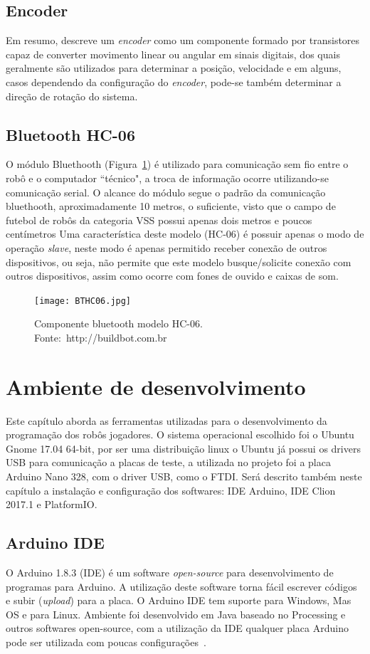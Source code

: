 \documentclass[a4paper,12pt,portuguese]{ufms-cpcx}
\begin{document}
\section{Encoder}\label{encoder}
Em resumo,  descreve um \textit{encoder} como um componente formado por transistores capaz de converter movimento linear ou angular em sinais digitais, dos quais geralmente são utilizados para determinar a posição, velocidade e em alguns, casos dependendo da configuração do \textit{encoder}, pode-se também determinar a direção de rotação do sistema. 

\section{Bluetooth HC-06}\label{bthc06}
O módulo Bluethooth (Figura~\ref{fig:BTHC06}) é utilizado para comunicação sem fio entre o robô e o computador ``técnico", a troca de informação ocorre utilizando-se comunicação serial. O alcance do módulo segue o padrão da comunicação bluethooth, aproximadamente 10 metros, o suficiente, visto que o campo de futebol de robôs da categoria VSS possui apenas dois metros e poucos centímetros Uma característica deste modelo (HC-06) é possuir apenas o modo de operação \textit{slave}, neste modo é apenas permitido receber conexão de outros dispositivos, ou seja, não permite que este modelo busque/solicite conexão com outros dispositivos, assim como ocorre com fones de ouvido e caixas de som.
\begin{figure}[H]	
	\centering
	\texttt{[image: BTHC06.jpg]}
	\caption{Componente bluetooth modelo HC-06. Fonte:~http://buildbot.com.br}
	\label{fig:BTHC06}
\end{figure}

\chapter{Ambiente de desenvolvimento}
Este capítulo aborda as ferramentas utilizadas para o desenvolvimento da programação dos robôs jogadores. O sistema operacional escolhido foi o Ubuntu Gnome 17.04 64-bit, por ser uma distribuição linux o Ubuntu já possui os drivers USB para comunicação a placas de teste, a utilizada no projeto foi a placa Arduino Nano 328, com o driver USB, como o FTDI. Será descrito também neste capítulo a instalação e configuração dos softwares: IDE Arduino, IDE Clion 2017.1 e PlatformIO.

\section{Arduino IDE}\label{arduinoide}
O Arduino 1.8.3 (IDE) é um software \textit{open-source} para desenvolvimento de programas para Arduino. A utilização deste software torna fácil escrever códigos e subir (\textit{upload}) para a placa. O Arduino IDE tem suporte para Windows, Mas OS e para Linux. Ambiente foi desenvolvido em Java baseado no Processing e outros softwares open-source, com a utilização da IDE qualquer placa Arduino pode ser utilizada com poucas configurações~\cite{sitearduinoide}.
\end{document}
